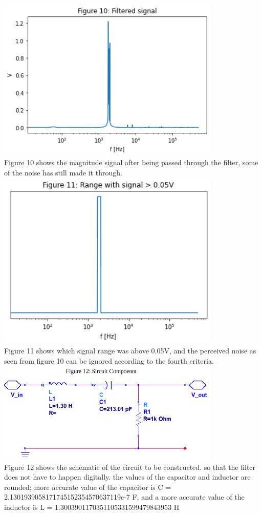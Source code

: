 \documentclass[12pt,a4paper]{article}
\begin{document}
\includegraphics[width=0.8\textwidth]{Figure 10.png}\\
Figure 10 shows the magnitude signal after being passed through the filter, some of the noise has still made it through.\\


\includegraphics[width=0.8\textwidth]{Figure 11.png}\\
Figure 11 shows which signal range was above 0.05V, and the perceived noise as seen from figure 10 can be ignored according to the fourth criteria.\\


\includegraphics[width=0.8\textwidth]{Figure 12.png}\\
Figure 12 shows the schematic of the circuit to be constructed. so that the filter does not have to happen digitally. the values of the capacitor and inductor are rounded; more accurate value of the capacitor is C = 2.1301939058171745152354570637119e-7 F, and a more accurate value of the inductor is L = 1.3003901170351105331599479843953 H \\
\end{document}
